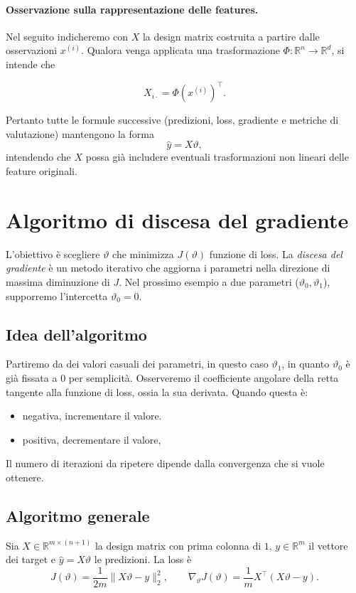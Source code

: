 \paragraph{Osservazione sulla rappresentazione delle features.}
Nel seguito indicheremo con $X$ la design matrix costruita a partire
dalle osservazioni $x^{(i)}$. Qualora venga applicata una trasformazione $\Phi:\mathbb{R}^n \to \mathbb{R}^d$, si intende che

\[
X_{i\cdot} = \Phi(x^{(i)})^\top.
\]

Pertanto tutte le formule successive (predizioni, loss,
gradiente e metriche di valutazione) mantengono la forma
\[
\hat y = X\vartheta,
\]
intendendo che $X$ possa già includere eventuali trasformazioni
non lineari delle feature originali.

\section{Algoritmo di discesa del gradiente}
L'obiettivo è scegliere \(\vartheta\) che minimizza \(J(\vartheta)\) funzione di loss. La \emph{discesa del gradiente}
è un metodo iterativo che aggiorna i parametri nella direzione di massima diminuzione di \(J\).
Nel prossimo esempio a due parametri ($\vartheta_0, \vartheta_1$), supporremo l'intercetta $\vartheta_0 = 0$.

\subsection{Idea dell'algoritmo}
Partiremo da dei valori casuali dei parametri, in questo caso $\vartheta_1$, in quanto $\vartheta_0$ è già fissata a 0 per semplicità.
Osserveremo il coefficiente angolare della retta tangente alla funzione di loss, ossia la sua derivata. Quando questa è:
\begin{itemize}
	\item negativa, incrementare il valore.
	\item positiva, decrementare il valore,
\end{itemize}

Il numero di iterazioni da ripetere dipende dalla convergenza che si vuole ottenere.

\subsection{Algoritmo generale}
Sia \(X\in\mathbb{R}^{m\times(n+1)}\) la design matrix con prima colonna di \(1\),
\(y\in\mathbb{R}^{m}\) il vettore dei target e \(\hat y=X\vartheta\) le predizioni. La loss è
\[
J(\vartheta)=\frac{1}{2m}\|X\vartheta-y\|_2^2,\qquad
\nabla_\vartheta J(\vartheta)=\frac{1}{m}X^\top(X\vartheta-y).
\]

